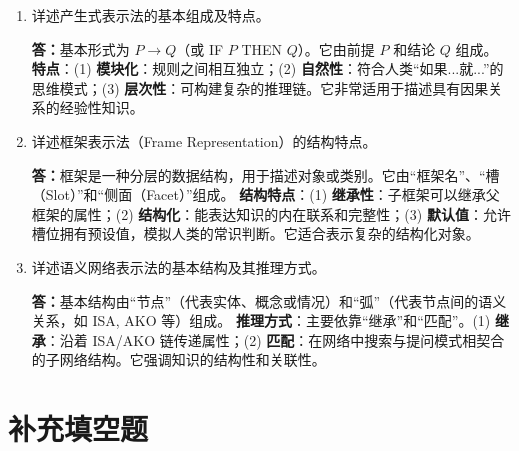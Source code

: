 \documentclass[12pt,a4paper,openany]{ctexbook}
\begin{document}
\begin{enumerate}[leftmargin=2em,itemsep=1em]
\item 详述产生式表示法的基本组成及特点。

\textbf{答：}基本形式为 $P \to Q$（或 IF $P$ THEN $Q$）。它由前提 $P$ 和结论 $Q$ 组成。
\textbf{特点}：(1) \textbf{模块化}：规则之间相互独立；(2) \textbf{自然性}：符合人类“如果...就...”的思维模式；(3) \textbf{层次性}：可构建复杂的推理链。它非常适用于描述具有因果关系的经验性知识。

\item 详述框架表示法（Frame Representation）的结构特点。

\textbf{答：}框架是一种分层的数据结构，用于描述对象或类别。它由“框架名”、“槽（Slot）”和“侧面（Facet）”组成。
\textbf{结构特点}：(1) \textbf{继承性}：子框架可以继承父框架的属性；(2) \textbf{结构化}：能表达知识的内在联系和完整性；(3) \textbf{默认值}：允许槽位拥有预设值，模拟人类的常识判断。它适合表示复杂的结构化对象。

\item 详述语义网络表示法的基本结构及其推理方式。

\textbf{答：}基本结构由“节点”（代表实体、概念或情况）和“弧”（代表节点间的语义关系，如 ISA, AKO 等）组成。
\textbf{推理方式}：主要依靠“继承”和“匹配”。(1) \textbf{继承}：沿着 ISA/AKO 链传递属性；(2) \textbf{匹配}：在网络中搜索与提问模式相契合的子网络结构。它强调知识的结构性和关联性。
\end{enumerate}

\section{补充填空题}
\end{document}
